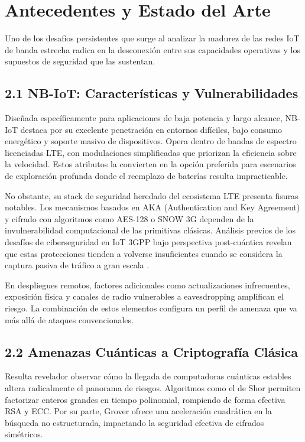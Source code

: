 \section{Antecedentes y Estado del Arte}

Uno de los desafíos persistentes que surge al analizar la madurez de las redes IoT de banda estrecha radica en la desconexión entre sus capacidades operativas y los supuestos de seguridad que las sustentan.

\subsection{2.1 NB-IoT: Características y Vulnerabilidades}

Diseñada específicamente para aplicaciones de baja potencia y largo alcance, NB-IoT destaca por su excelente penetración en entornos difíciles, bajo consumo energético y soporte masivo de dispositivos. Opera dentro de bandas de espectro licenciadas LTE, con modulaciones simplificadas que priorizan la eficiencia sobre la velocidad. Estos atributos la convierten en la opción preferida para escenarios de exploración profunda donde el reemplazo de baterías resulta impracticable.

No obstante, su stack de seguridad heredado del ecosistema LTE presenta fisuras notables. Los mecanismos basados en AKA (Authentication and Key Agreement) y cifrado con algoritmos como AES-128 o SNOW 3G dependen de la invulnerabilidad computacional de las primitivas clásicas. Análisis previos de los desafíos de ciberseguridad en IoT 3GPP bajo perspectiva post-cuántica revelan que estas protecciones tienden a volverse insuficientes cuando se considera la captura pasiva de tráfico a gran escala \cite{Althobaiti2020_Cybersecurity}. 

En despliegues remotos, factores adicionales como actualizaciones infrecuentes, exposición física y canales de radio vulnerables a eavesdropping amplifican el riesgo. La combinación de estos elementos configura un perfil de amenaza que va más allá de ataques convencionales.

\subsection{2.2 Amenazas Cuánticas a Criptografía Clásica}

Resulta revelador observar cómo la llegada de computadoras cuánticas estables altera radicalmente el panorama de riesgos. Algoritmos como el de Shor permiten factorizar enteros grandes en tiempo polinomial, rompiendo de forma efectiva RSA y ECC. Por su parte, Grover ofrece una aceleración cuadrática en la búsqueda no estructurada, impactando la seguridad efectiva de cifrados simétricos.

